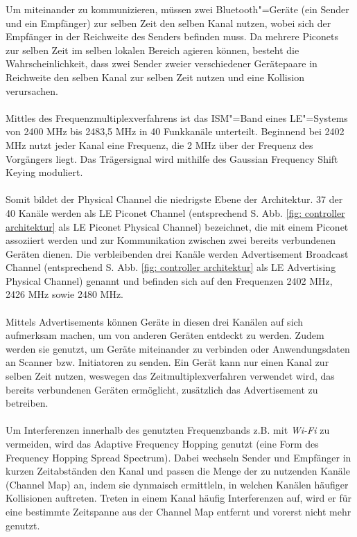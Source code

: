 Um miteinander zu kommunizieren, müssen zwei Bluetooth"=Geräte (ein Sender und ein Empfänger) zur selben Zeit den selben Kanal nutzen, wobei sich der Empfänger in der Reichweite des Senders befinden muss. Da mehrere Piconets zur selben Zeit im selben lokalen Bereich agieren können, besteht die Wahrscheinlichkeit, dass zwei Sender zweier verschiedener Gerätepaare in Reichweite den selben Kanal zur selben Zeit nutzen und eine Kollision verursachen.
\\\\
Mittles des Frequenzmultiplexverfahrens ist das ISM"=Band eines LE"=Systems von 2400 MHz bis 2483,5 MHz in 40 Funkkanäle unterteilt. Beginnend bei 2402 MHz nutzt jeder Kanal eine Frequenz, die 2 MHz über der Frequenz des Vorgängers liegt. Das Trägersignal wird mithilfe des Gaussian Frequency Shift Keying moduliert. \cite{BtSpec4.0_2180-2181}
\\\\
Somit bildet der Physical Channel die niedrigste Ebene der Architektur. 37 der 40 Kanäle werden als LE Piconet Channel (entsprechend S. \pageref{fig: controller architektur} Abb. \ref{fig: controller architektur} als LE Piconet Physical Channel) bezeichnet, die mit einem Piconet assoziiert werden und zur Kommunikation zwischen zwei bereits verbundenen Geräten dienen. Die verbleibenden drei Kanäle werden Advertisement Broadcast Channel (entsprechend S. \pageref{fig: controller architektur} Abb. \ref{fig: controller architektur} als LE Advertising Physical Channel) genannt und befinden sich auf den Frequenzen 2402 MHz, 2426 MHz sowie 2480 MHz. \cite{BtSpec4.0_2199}
\\\\
Mittels Advertisements können Geräte in diesen drei Kanälen auf sich aufmerksam machen, um von anderen Geräten entdeckt zu werden. Zudem werden sie genutzt, um Geräte miteinander zu verbinden oder Anwendungsdaten an Scanner bzw. Initiatoren zu senden. Ein Gerät kann nur einen Kanal zur selben Zeit nutzen, weswegen das Zeitmultiplexverfahren verwendet wird, das bereits verbundenen Geräten ermöglicht, zusätzlich das Advertisement zu betreiben.
\\\\
Um Interferenzen innerhalb des genutzten Frequenzbands z.B. mit \textit{Wi-Fi} zu vermeiden, wird das Adaptive Frequency Hopping \cite{BtAfh} genutzt (eine Form des Frequency Hopping Spread Spectrum). Dabei wechseln Sender und Empfänger in kurzen Zeitabständen den Kanal und passen die Menge der zu nutzenden Kanäle (Channel Map) an, indem sie dynmaisch ermittleln, in welchen Kanälen häufiger Kollisionen auftreten. Treten in einem Kanal häufig Interferenzen auf, wird er für eine bestimmte Zeitspanne aus der Channel Map entfernt und vorerst nicht mehr genutzt.
